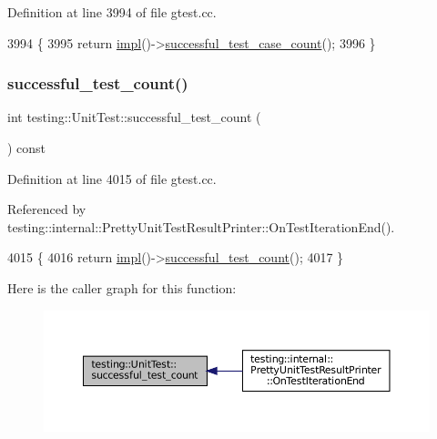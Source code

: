 Definition at line 3994 of file gtest.\+cc.


\begin{DoxyCode}
3994                                                \{
3995   \textcolor{keywordflow}{return} \hyperlink{classtesting_1_1UnitTest_a4df5d11a58affb337d7fa62eaa07690e}{impl}()->\hyperlink{classtesting_1_1internal_1_1UnitTestImpl_a2db3a2b3fed8065dbdd768ee407bf67e}{successful\_test\_case\_count}();
3996 \}
\end{DoxyCode}
\mbox{\label{classtesting_1_1UnitTest_a49ee8056e357ad497e67399447dd5a40}} 
\subsubsection{\texorpdfstring{successful\+\_\+test\+\_\+count()}{successful\_test\_count()}}
{\footnotesize\ttfamily int testing\+::\+Unit\+Test\+::successful\+\_\+test\+\_\+count (\begin{DoxyParamCaption}{ }\end{DoxyParamCaption}) const}



Definition at line 4015 of file gtest.\+cc.



Referenced by testing\+::internal\+::\+Pretty\+Unit\+Test\+Result\+Printer\+::\+On\+Test\+Iteration\+End().


\begin{DoxyCode}
4015                                           \{
4016   \textcolor{keywordflow}{return} \hyperlink{classtesting_1_1UnitTest_a4df5d11a58affb337d7fa62eaa07690e}{impl}()->\hyperlink{classtesting_1_1internal_1_1UnitTestImpl_ac363f681cbecf10fea5c04408b98e744}{successful\_test\_count}();
4017 \}
\end{DoxyCode}
Here is the caller graph for this function\+:
\nopagebreak
\begin{figure}[H]
\begin{center}
\leavevmode
\includegraphics[width=350pt]{classtesting_1_1UnitTest_a49ee8056e357ad497e67399447dd5a40_icgraph}
\end{center}
\end{figure}
\mbox{\label{classtesting_1_1UnitTest_a965248fbe72f9fede5de921b6666943b}} 
